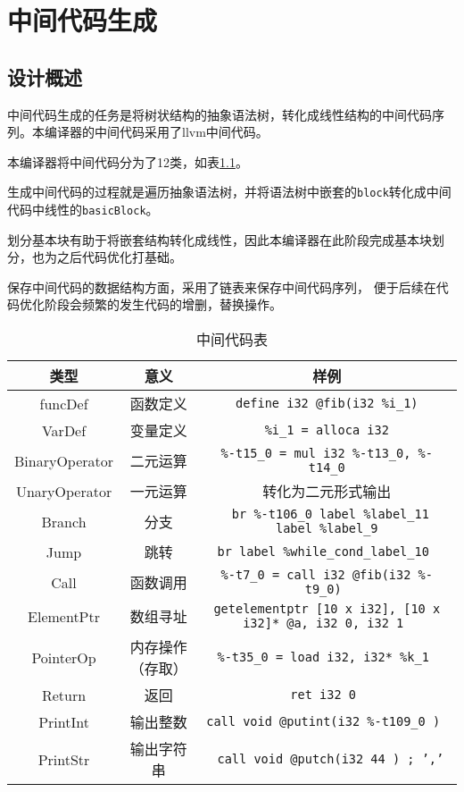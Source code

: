 \chapter{中间代码生成}
\section{设计概述}

中间代码生成的任务是将树状结构的抽象语法树，转化成线性结构的中间代码序列。本编译器的中间代码采用了llvm中间代码。

本编译器将中间代码分为了12类，如表\ref{table:midcode}。

生成中间代码的过程就是遍历抽象语法树，并将语法树中嵌套的\texttt{block}转化成中间代码中线性的\texttt{basicBlock}。

划分基本块有助于将嵌套结构转化成线性，因此本编译器在此阶段完成基本块划分，也为之后代码优化打基础。

保存中间代码的数据结构方面，采用了链表来保存中间代码序列，
便于后续在代码优化阶段会频繁的发生代码的增删，替换操作。

\begin{table}[H] 
    \centering
    \begin{tabular}{ccc}
    \toprule 
    类型 & 意义 & 样例 \\
    \midrule
    funcDef & 函数定义 & \texttt{define i32 @fib(i32 \%i\_1)} \\
    VarDef & 变量定义  & \texttt{\%i\_1 = alloca i32} \\
    BinaryOperator &  二元运算 & \texttt{\%-t15\_0 = mul i32 \%-t13\_0, \%-t14\_0}\\
    UnaryOperator &  一元运算 & 转化为二元形式输出 \\
    Branch & 分支 & \texttt{ br \%-t106\_0 label \%label\_11 label \%label\_9}\\
    Jump & 跳转 & \texttt{br label \%while\_cond\_label\_10 }\\
    Call & 函数调用 &\texttt{\%-t7\_0 = call i32 @fib(i32 \%-t9\_0) }\\
    ElementPtr & 数组寻址  &\texttt{getelementptr [10 x i32], [10 x i32]* @a, i32 0, i32 1 }\\
    PointerOp  &  内存操作（存取）&\texttt{\%-t35\_0 = load i32, i32* \%k\_1 }\\
    Return & 返回 &\texttt{ret i32 0 } \\
    PrintInt & 输出整数 & \texttt{call void @putint(i32 \%-t109\_0 ) }\\
    PrintStr & 输出字符串 & \texttt{ call void @putch(i32 44 )    ; ','}\\
    \bottomrule %
    \end{tabular}
    \caption{中间代码表}
    \label{table:midcode}
\end{table}

